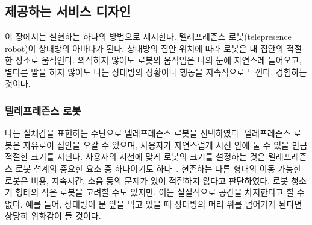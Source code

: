 \chapter{\approach}
\label{sec:system_design}
    
\section{ 제공하는 서비스 디자인}


이 장에서는 \concept\을 실현하는 하나의 방법으로 \approach\를 제시한다. 텔레프레즌스 로봇(telepresence robot)이 상대방의 아바타가 된다. 상대방의 집안 위치에 따라 로봇은 내 집안의 적절한 장소로 움직인다. 의식하지 않아도 로봇의 움직임은 나의 눈에 자연스레 들어오고, 별다른 말을 하지 않아도 나는 상대방의 상황이나 행동을 지속적으로 느낀다. \concept\을 경험하는 것이다.

\subsection{텔레프레즌스 로봇}


나는 실체감을 표현하는 수단으로 텔레프레즌스 로봇을 선택하였다. 텔레프레즌스 로봇은 자유로이 집안을 오갈 수 있으며, 사용자가 자연스럽게 시선 안에 둘 수 있을 만큼 적절한 크기를 지닌다. 사용자의 시선에 맞게 로봇의 크기를 설정하는 것은 텔레프레즌스 로봇 설계의 중요한 요소 중 하나이기도 하다~\cite{desai2011essential}. 현존하는 다른 형태의 이동 가능한 로봇은 비용, 지속시간, 소음 등의 문제가 있어 적절하지 않다고 판단하였다. 로봇 청소기 형태의 작은 로봇을 고려할 수도 있지만, 이는 실질적으로 공간을 차지한다고 할 수 없다. 예를 들어, 상대방이 문 앞을 막고 있을 때 상대방의 머리 위를 넘어가게 된다면 상당히 위화감이 들 것이다.

